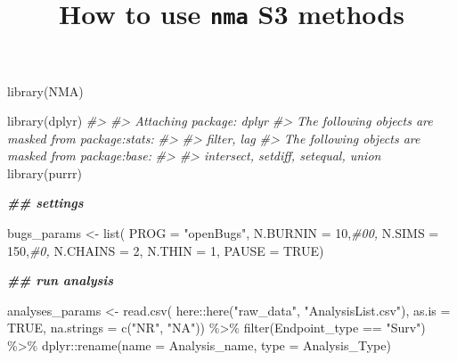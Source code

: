 \documentclass[
]{article}
\title{How to use \texttt{nma} S3 methods}
\author{}
\date{\vspace{-2.5em}}
\newenvironment{Shaded}{\begin{snugshade}}{\end{snugshade}}
\newcommand{\AttributeTok}[1]{\textcolor[rgb]{0.77,0.63,0.00}{#1}}
\newcommand{\CommentTok}[1]{\textcolor[rgb]{0.56,0.35,0.01}{\textit{#1}}}
\newcommand{\ConstantTok}[1]{\textcolor[rgb]{0.00,0.00,0.00}{#1}}
\newcommand{\DecValTok}[1]{\textcolor[rgb]{0.00,0.00,0.81}{#1}}
\newcommand{\DocumentationTok}[1]{\textcolor[rgb]{0.56,0.35,0.01}{\textbf{\textit{#1}}}}
\newcommand{\FunctionTok}[1]{\textcolor[rgb]{0.00,0.00,0.00}{#1}}
\newcommand{\NormalTok}[1]{#1}
\newcommand{\OtherTok}[1]{\textcolor[rgb]{0.56,0.35,0.01}{#1}}
\newcommand{\SpecialCharTok}[1]{\textcolor[rgb]{0.00,0.00,0.00}{#1}}
\newcommand{\StringTok}[1]{\textcolor[rgb]{0.31,0.60,0.02}{#1}}
\begin{document}
\maketitle

\begin{Shaded}
\begin{Highlighting}[]
\FunctionTok{library}\NormalTok{(NMA)}
\end{Highlighting}
\end{Shaded}

\begin{Shaded}
\begin{Highlighting}[]
\FunctionTok{library}\NormalTok{(dplyr)}
\CommentTok{\#\textgreater{} }
\CommentTok{\#\textgreater{} Attaching package: \textquotesingle{}dplyr\textquotesingle{}}
\CommentTok{\#\textgreater{} The following objects are masked from \textquotesingle{}package:stats\textquotesingle{}:}
\CommentTok{\#\textgreater{} }
\CommentTok{\#\textgreater{}     filter, lag}
\CommentTok{\#\textgreater{} The following objects are masked from \textquotesingle{}package:base\textquotesingle{}:}
\CommentTok{\#\textgreater{} }
\CommentTok{\#\textgreater{}     intersect, setdiff, setequal, union}
\FunctionTok{library}\NormalTok{(purrr)}


\DocumentationTok{\#\# settings}

\NormalTok{bugs\_params }\OtherTok{\textless{}{-}}
  \FunctionTok{list}\NormalTok{(}
    \AttributeTok{PROG =} \StringTok{"openBugs"}\NormalTok{,}
    \AttributeTok{N.BURNIN =} \DecValTok{10}\NormalTok{,}\CommentTok{\#00,}
    \AttributeTok{N.SIMS =} \DecValTok{150}\NormalTok{,}\CommentTok{\#0,}
    \AttributeTok{N.CHAINS =} \DecValTok{2}\NormalTok{,}
    \AttributeTok{N.THIN =} \DecValTok{1}\NormalTok{,}
    \AttributeTok{PAUSE =} \ConstantTok{TRUE}\NormalTok{)}


\DocumentationTok{\#\# run analysis}

\NormalTok{analyses\_params }\OtherTok{\textless{}{-}}
  \FunctionTok{read.csv}\NormalTok{(}
\NormalTok{    here}\SpecialCharTok{::}\FunctionTok{here}\NormalTok{(}\StringTok{"raw\_data"}\NormalTok{, }\StringTok{"AnalysisList.csv"}\NormalTok{),}
    \AttributeTok{as.is =} \ConstantTok{TRUE}\NormalTok{,}
    \AttributeTok{na.strings =} \FunctionTok{c}\NormalTok{(}\StringTok{"NR"}\NormalTok{, }\StringTok{"NA"}\NormalTok{)) }\SpecialCharTok{\%\textgreater{}\%} 
  \FunctionTok{filter}\NormalTok{(Endpoint\_type }\SpecialCharTok{==} \StringTok{"Surv"}\NormalTok{) }\SpecialCharTok{\%\textgreater{}\%} 
\NormalTok{  dplyr}\SpecialCharTok{::}\FunctionTok{rename}\NormalTok{(}\AttributeTok{name =}\NormalTok{ Analysis\_name,}
                \AttributeTok{type =}\NormalTok{ Analysis\_Type)}



\end{Highlighting}
\end{Shaded}
\end{document}
